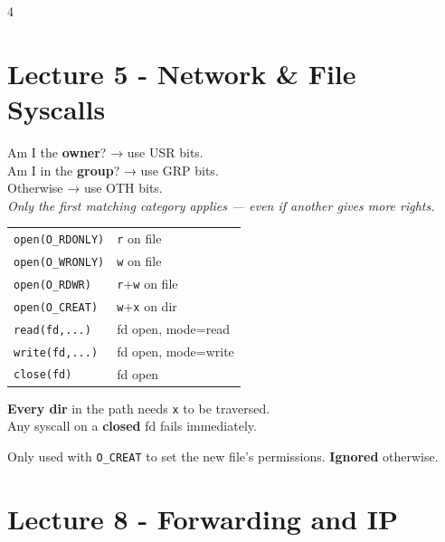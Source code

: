 \documentclass[8pt,a4paper,landscape]{extarticle}
\begin{document}
\begin{multicols*}{4}


\section{Lecture 5 - Network \& File Syscalls}

\begin{defn}[title=Permission bits]
    Am I the \textbf{owner}? → use USR bits.\\
    Am I in the \textbf{group}? → use GRP bits.\\
    Otherwise → use OTH bits.\\
    \textit{Only the first matching category applies — even if another gives more rights.}
\end{defn}

\begin{prop}[title=Syscall success conditions]
    \begin{tabular}{ll}
        \texttt{open(O\_RDONLY)} & \texttt{r} on file \\
        \texttt{open(O\_WRONLY)} & \texttt{w} on file \\
        \texttt{open(O\_RDWR)}   & \texttt{r}+\texttt{w} on file \\
        \texttt{open(O\_CREAT)}  & \texttt{w}+\texttt{x} on dir \\
        \texttt{read(fd,...)}    & fd open, mode=read \\
        \texttt{write(fd,...)}   & fd open, mode=write \\
        \texttt{close(fd)}       & fd open \\
    \end{tabular}

    \textbf{Every dir} in the path needs \texttt{x} to be traversed.\\
    Any syscall on a \textbf{closed} fd fails immediately.
\end{prop}

\begin{thm}[title=\texttt{S\_*} flags]
    Only used with \texttt{O\_CREAT} to set the new file's permissions. \textbf{Ignored} otherwise.
\end{thm}

\section{Lecture 8 - Forwarding and IP}


\end{multicols*}
\end{document}
